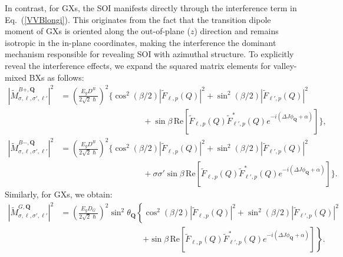 In contrast, for GXs, the SOI manifests directly through the interference term in Eq.~(\ref{VVBlongi}). This originates from the fact that the transition dipole moment of GXs is oriented along the out-of-plane ($z$) direction and remains isotropic in the in-plane coordinates, making the interference the dominant mechanism responsible for revealing SOI with azimuthal structure.
To explicitly reveal the interference effects, we expand the squared matrix elements for valley-mixed BXs as follows:
\begin{equation}
\begin{aligned}
\left|\tilde{M}_{\sigma, \ell, \sigma', \ell'}^{B+, \boldsymbol{Q}}\right|^2
&= \left( \frac{E_g D^B}{2\sqrt{2}\hslash} \right)^2
\Bigg\{ %
\cos^2(\beta/2) \left|\tilde{F}_{\ell, p}(Q)\right|^2
+ \sin^2(\beta/2)\left|\tilde{F}_{\ell', p}(Q)\right|^2  \\ 
&\hspace{10em} + \sin\beta \,
\mathrm{Re}\left[
\tilde{F}_{\ell, p}(Q)\tilde{F}^*_{\ell', p}(Q)
e^{-i(\Delta J \phi_{\boldsymbol{Q}} + \alpha)}
\right]
\Bigg\}, \\ %
\left|\tilde{M}_{\sigma, \ell, \sigma', \ell'}^{B-, \boldsymbol{Q}}\right|^2
&= \left( \frac{E_g D^B}{2\sqrt{2}\hslash} \right)^2
\Bigg\{ %
\cos^2(\beta/2) \left|\tilde{F}_{\ell, p}(Q)\right|^2
+ \sin^2(\beta/2)\left|\tilde{F}_{\ell', p}(Q)\right|^2  \\ 
&\hspace{10em} + \sigma\sigma'\sin\beta \,
\mathrm{Re}\left[
\tilde{F}_{\ell, p}(Q)\tilde{F}^*_{\ell', p}(Q)
e^{-i(\Delta J \phi_{\boldsymbol{Q}} + \alpha)}
\right]
\Bigg\}. 
\end{aligned}
\label{expanded^B}
\end{equation}
Similarly, for GXs, we obtain:
\begin{equation}
\begin{aligned}
\left|\tilde{M}_{\sigma, \ell, \sigma', \ell'}^{G, \boldsymbol{Q}}\right|^2
&= \left( \frac{E_g D_G}{2\sqrt{2}\hslash} \right)^2
\sin^2\theta_{\boldsymbol{Q}}
\left\{
\cos^2(\beta/2) \left|\tilde{F}_{\ell, p}(Q)\right|^2
+ \sin^2(\beta/2)\left|\tilde{F}_{\ell', p}(Q)\right|^2 \right. \\
&\hspace{10em}\left.
+ \sin\beta \,
\mathrm{Re}\left[
\tilde{F}_{\ell, p}(Q)\tilde{F}^*_{\ell', p}(Q)
e^{-i(\Delta J \phi_{\boldsymbol{Q}} + \alpha)}
\right]
\right\}.
\end{aligned}
\label{expanded_G}
\end{equation}

